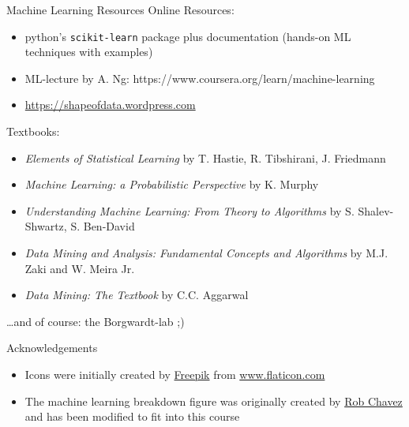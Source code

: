 \documentclass[aspectratio=169]{beamer}
\begin{document}
\begin{frame}{Machine Learning Resources}
    \scriptsize
    Online Resources:
    \begin{itemize}
        \item python's \texttt{scikit-learn} package plus documentation (hands-on ML techniques with examples)
        \item ML-lecture by A. Ng: https://www.coursera.org/learn/machine-learning
        \item \url{https://shapeofdata.wordpress.com}
    \end{itemize}
    \vspace{0.5cm}
    Textbooks:
    \begin{itemize}
        \item \textit{Elements of Statistical Learning} by T. Hastie, R. Tibshirani, J. Friedmann
        \item \textit{Machine Learning: a Probabilistic Perspective} by K. Murphy
        \item \textit{Understanding Machine Learning: From Theory to Algorithms} by S. Shalev-Shwartz, S. Ben-David
        \item \textit{Data Mining and Analysis: Fundamental Concepts and Algorithms} by  M.J. Zaki and W. Meira Jr.
        \item \textit{Data Mining: The Textbook} by C.C. Aggarwal
    \end{itemize}
    \vspace{0.5cm}
    \dots and of course: the Borgwardt-lab ;)
\end{frame}

  \begin{frame}{Acknowledgements}
    \begin{itemize}
      \item Icons were initially created by \href{https://www.freepik.com/home}{Freepik} from \href{https://www.flaticon.com}{www.flaticon.com}
      \item The machine learning breakdown figure was originally created
        by \href{https://robchavez.org}{Rob Chavez} and has been
        modified to fit into this course
    \end{itemize}
  \end{frame}
\end{document}
